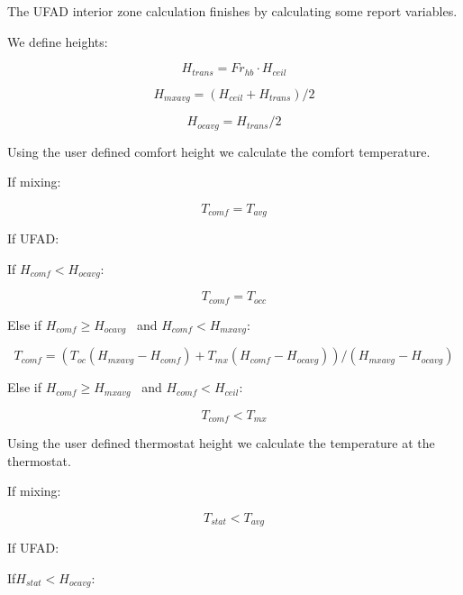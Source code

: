 {The UFAD interior zone calculation finishes by calculating some report variables.

We define heights:

\begin{equation}
{H_{trans}} = F{r_{hb}} \cdot {H_{ceil}}
\end{equation}

\begin{equation}
{H_{mxavg}} = \left( {{H_{ceil}} + {H_{trans}}} \right)/2
\end{equation}

\begin{equation}
{H_{ocavg}} = {H_{trans}}/2
\end{equation}

Using the user defined comfort height we calculate the comfort temperature.

If mixing:

\begin{equation}
{T_{comf}} = {T_{avg}}
\end{equation}

If UFAD:

If \({H_{comf}} < {H_{ocavg}}\):

\begin{equation}
{T_{comf}} = {T_{occ}}
\end{equation}

Else if \({H_{comf}} \ge {H_{ocavg}}\) ~and \({H_{comf}} < {H_{mxavg}}\):

\begin{equation}
{T_{comf}} = \left( {{T_{oc}}\left( {{H_{mxavg}} - {H_{comf}}} \right) + {T_{mx}}\left( {{H_{comf}} - {H_{ocavg}}} \right)} \right)/\left( {{H_{mxavg}} - {H_{ocavg}}} \right)
\end{equation}

Else if \({H_{comf}} \ge {H_{mxavg}}\) ~and \({H_{comf}} < {H_{ceil}}\):

\begin{equation}
{T_{comf}} < {T_{mx}}
\end{equation}

Using the user defined thermostat height we calculate the temperature at the thermostat.

If mixing:

\begin{equation}
{T_{stat}} < {T_{avg}}
\end{equation}

If UFAD:

If\({H_{stat}} < {H_{ocavg}}\):

}
